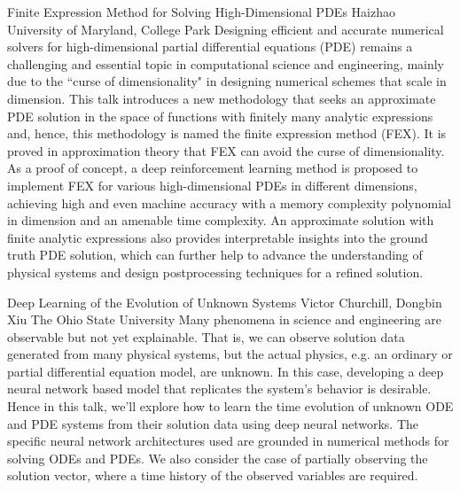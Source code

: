 \begin{addmargin}[2em]{0em}
\vspace{2ex}
\abs
{Finite Expression Method for Solving High-Dimensional PDEs}
{Haizhao}
{University of Maryland, College Park}
{Designing efficient and accurate numerical solvers for high-dimensional partial differential equations (PDE) remains a challenging and essential topic in computational science and engineering, mainly due to the ``curse of dimensionality" in designing numerical schemes that scale in dimension. This talk introduces a new methodology that seeks an approximate PDE solution in the space of functions with finitely many analytic expressions and, hence, this methodology is named the finite expression method (FEX). It is proved in approximation theory that FEX can avoid the curse of dimensionality. As a proof of concept, a deep reinforcement learning method is proposed to implement FEX for various high-dimensional PDEs in different dimensions, achieving high and even machine accuracy with a memory complexity polynomial in dimension and an amenable time complexity. An approximate solution with finite analytic expressions also provides interpretable insights into the ground truth PDE solution, which can further help to advance the understanding of physical systems and design postprocessing techniques for a refined solution.}


\vspace{1.5ex}
\abs
{Deep Learning of the Evolution of Unknown Systems}
{Victor Churchill, Dongbin Xiu}
{The Ohio State University}
{Many phenomena in science and engineering are observable but not yet explainable. That is, we can observe solution data generated from many physical systems, but the actual physics, e.g. an ordinary or partial differential equation model, are unknown. In this case, developing a deep neural network based model that replicates the system’s behavior is desirable. Hence in this talk, we’ll explore how to learn the time evolution of unknown ODE and PDE systems from their solution data using deep neural networks. The specific neural network architectures used are grounded in numerical methods for solving ODEs and PDEs. We also consider the case of partially observing the solution vector, where a time history of the observed variables are required.}



\end{addmargin}
